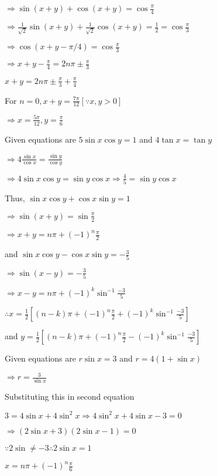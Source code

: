   $\Rightarrow \sin(x + y) + \cos (x + y) = \cos\frac{\pi}{4}$

  $\Rightarrow \frac{1}{\sqrt{2}}\sin(x + y) + \frac{1}{\sqrt{2}}\cos(x + y) = \frac{1}{2} = \cos\frac{\pi}{3}$

  $\Rightarrow \cos(x + y - \pi/4) = \cos\frac{\pi}{3}$

  $\Rightarrow x + y - \frac{\pi}{4} = 2n\pi\pm \frac{\pi}{3}$

  $x + y = 2n\pi \pm \frac{\pi}{3} + \frac{\pi}{4}$

  For $n = 0, x + y = \frac{7\pi}{12}[\because x, y > 0]$

  $\Rightarrow x = \frac{5\pi}{12}, y = \frac{\pi}{6}$

\item Given equations are $5\sin x\cos y = 1$ and $4\tan x = \tan y$

  $\Rightarrow 4\frac{\sin x}{\cos x} = \frac{\sin y}{\cos y}$

  $\Rightarrow 4\sin x\cos y = \sin y \cos x \Rightarrow \frac{4}{5} = \sin y\cos x$

  Thus, $\sin x\cos y + \cos x\sin y = 1$

  $\Rightarrow \sin(x + y) = \sin\frac{\pi}{2}$

  $\Rightarrow x + y = n\pi + (-1)^n\frac{\pi}{2}$

  and $\sin x\cos y - \cos x\sin y = -\frac{3}{5}$

  $\Rightarrow \sin(x - y) = -\frac{3}{5}$

  $\Rightarrow x - y = n\pi + (-1)^k\sin^{-1}\frac{-3}{5}$

  $\therefore x = \frac{1}{2}\left[(n - k)\pi +(-1)^n\frac{\pi}{2} + (-1)^k\sin^{-1}\frac{-3}{5}\right]$

  and $y = \frac{1}{2}\left[(n - k)\pi +(-1)^n\frac{\pi}{2} - (-1)^k\sin^{-1}\frac{-3}{5}\right]$

\item Given equations are $r\sin x = 3$ and $r = 4(1 + \sin x)$

  $\Rightarrow r = \frac{3}{\sin x}$

  Substituting this in second equation

  $3 = 4\sin x + 4\sin^2x \Rightarrow 4\sin^2x + 4\sin x - 3 = 0$

  $\Rightarrow (2\sin x + 3)(2\sin x - 1) = 0$

  $\because 2\sin \neq -3 \therefore 2\sin x = 1$

  $x = n\pi + (-1)^n\frac{\pi}{6}$

